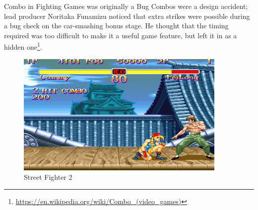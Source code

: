 \documentclass{beamer}
\begin{document}
\begin{frame}[t]{Combo in Fighting Games was originally a Bug}
    Combos were a design accident; lead producer Noritaka Funamizu noticed that extra strikes were possible during a bug check on the car-smashing bonus stage. He thought that the timing required was too difficult to make it a useful game feature, but left it in as a hidden one\footnote{\url{https://en.wikipedia.org/wiki/Combo_(video_games)}}.

    \begin{figure}
    \begin{center}
    \includegraphics[width=.5\textwidth]{Super_Street_Fighter_II_screenshot.png}
    \end{center}
    \caption{Street Fighter 2}
    \label{fig:}
    \end{figure}

\end{frame}
\end{document}
